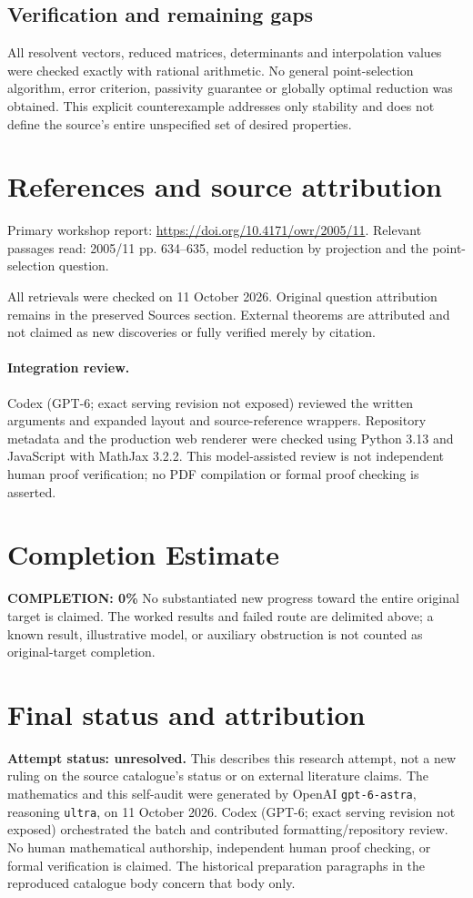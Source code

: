 \documentclass[11pt]{article}
\begin{document}
\subsection{Verification and remaining gaps}
All resolvent vectors, reduced matrices, determinants and interpolation values were checked exactly with rational arithmetic. No general point-selection algorithm, error criterion, passivity guarantee or globally optimal reduction was obtained. This explicit counterexample addresses only stability and does not define the source's entire unspecified set of desired properties.

\section{References and source attribution}
Primary workshop report: \url{https://doi.org/10.4171/owr/2005/11}. Relevant passages read: 2005/11 pp. 634--635, model reduction by projection and the point-selection question.

All retrievals were checked on 11 October 2026. Original question attribution remains in the preserved Sources section. External theorems are attributed and not claimed as new discoveries or fully verified merely by citation.


\paragraph{Integration review.} Codex (GPT-6; exact serving revision not exposed) reviewed the written arguments and expanded layout and source-reference wrappers. Repository metadata and the production web renderer were checked using Python 3.13 and JavaScript with MathJax 3.2.2. This model-assisted review is not independent human proof verification; no PDF compilation or formal proof checking is asserted.

\section{Completion Estimate}
\noindent\textbf{COMPLETION: 0\%}
No substantiated new progress toward the entire original target is claimed. The worked results and failed route are delimited above; a known result, illustrative model, or auxiliary obstruction is not counted as original-target completion.

\section{Final status and attribution}
\textbf{Attempt status: unresolved.} This describes this research attempt, not a new ruling on the source catalogue's status or on external literature claims.
The mathematics and this self-audit were generated by OpenAI \texttt{gpt-6-astra}, reasoning \texttt{ultra}, on 11 October 2026. Codex (GPT-6; exact serving revision not exposed) orchestrated the batch and contributed formatting/repository review. No human mathematical authorship, independent human proof checking, or formal verification is claimed. The historical preparation paragraphs in the reproduced catalogue body concern that body only.
\end{document}

